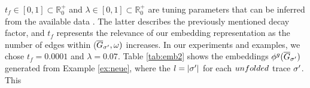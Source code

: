 \begin{example} %
$t_f\in [0,1]\subset\mathbb{R}^+_{0}$ and $\lambda\in [0,1]\subset\mathbb{R}^+_{0}$ are tuning parameters that can be
inferred from the available data \cite{DriessensRG06}. The latter describes the previously mentioned decay factor, and $t_f$
represents the relevance of our embedding representation as the number of edges within ($\overline{G}_{\sigma'},\omega)$ increases. In our experiments and
examples, we chose $t_f=0.0001$ and $\lambda=0.07$.
Table \ref{tab:emb2} shows the embeddings $\phi^{g}(\overline{G}_{\sigma'})$ generated from
Example \ref{ex:neue}, where the $l=|{\sigma'}|$ for each $unfolded$ trace ${\sigma'}$. This

\end{example}
